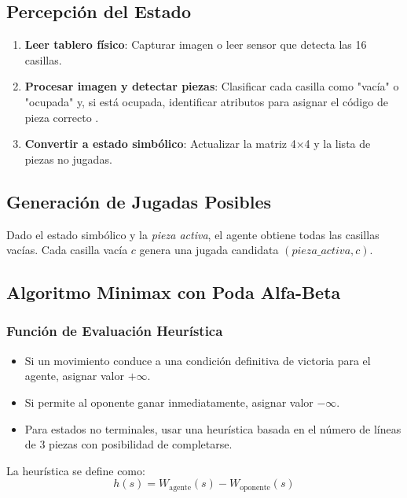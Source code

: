 \documentclass[conference]{IEEEtran}
\begin{document}
\subsection{Percepción del Estado}

\begin{enumerate}
\item \textbf{Leer tablero físico}: Capturar imagen o leer sensor que detecta las 16 casillas.
\item \textbf{Procesar imagen y detectar piezas}: Clasificar cada casilla como "vacía" o "ocupada" y, si está ocupada, identificar atributos para asignar el código de pieza correcto \cite{muller2009}.
\item \textbf{Convertir a estado simbólico}: Actualizar la matriz 4×4 y la lista de piezas no jugadas.
\end{enumerate}

\subsection{Generación de Jugadas Posibles}

Dado el estado simbólico y la \textit{pieza activa}, el agente obtiene todas las casillas vacías. Cada casilla vacía $c$ genera una jugada candidata $(pieza\_activa, c)$.

\subsection{Algoritmo Minimax con Poda Alfa-Beta}

\subsubsection{Función de Evaluación Heurística}
\begin{itemize}
\item Si un movimiento conduce a una condición definitiva de victoria para el agente, asignar valor $+\infty$.
\item Si permite al oponente ganar inmediatamente, asignar valor $-\infty$.
\item Para estados no terminales, usar una heurística basada en el número de líneas de 3 piezas con posibilidad de completarse.
\end{itemize}

La heurística se define como:
\begin{equation}
h(s) = W_{\text{agente}}(s) - W_{\text{oponente}}(s)
\end{equation}
\end{document}
